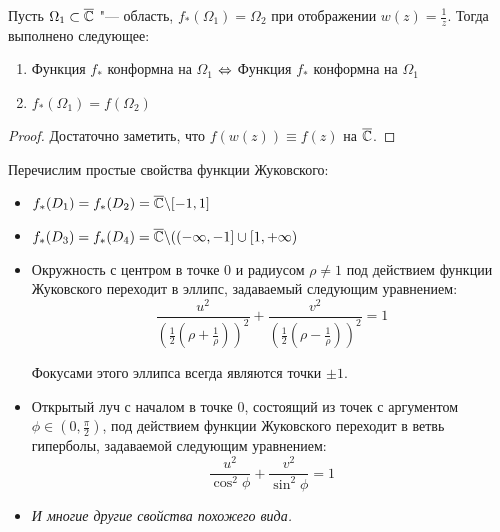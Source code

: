 \begin{proposition}
	Пусть $\Omega_1 \subset \overline{\mathbb{C}}$ "--- область, $f_*(\Omega_1) = \Omega_2$ при отображении $w(z) = \frac 1z$. Тогда выполнено следующее:
	\begin{enumerate}
		\item Функция $f_*$ конформна на $\Omega_1$ $\Leftrightarrow$ Функция $f_*$ конформна на $\Omega_1$
		\item $f_*(\Omega_1) = f(\Omega_2)$
	\end{enumerate}
\end{proposition}

\begin{proof}
	Достаточно заметить, что $f(w(z)) \equiv f(z)$ на $\overline{\mathbb{C}}$.
\end{proof}

\begin{note}
	Перечислим простые свойства функции Жуковского:
	\begin{itemize}
		\item $f_*(D_1) = f_*(D_2) = \overline{\mathbb{C}} \backslash [-1, 1]$
		\item $f_*(D_3) = f_*(D_4) = \overline{\mathbb{C}} \backslash ((-\infty, -1] \cup [1, +\infty)$
		\item Окружность с центром в точке $0$ и радиусом $\rho \ne 1$ под действием функции Жуковского переходит в эллипс, задаваемый следующим уравнением:
		\[\frac{u^2}{\left(\frac12\left(\rho + \frac 1\rho\right)\right)^2} + \frac{v^2}{\left(\frac12\left(\rho - \frac 1\rho\right)\right)^2} = 1\]
		
		Фокусами этого эллипса всегда являются точки $\pm1$.
		\item Открытый луч с началом в точке $0$, состоящий из точек с аргументом $\phi \in \left(0, \frac\pi 2\right)$, под действием функции Жуковского переходит в ветвь гиперболы, задаваемой следующим уравнением:
		\[\frac{u^2}{\cos^2\phi} + \frac{v^2}{\sin^2\phi} = 1\]
		\item \textit{И многие другие свойства похожего вида.}
	\end{itemize}
\end{note}